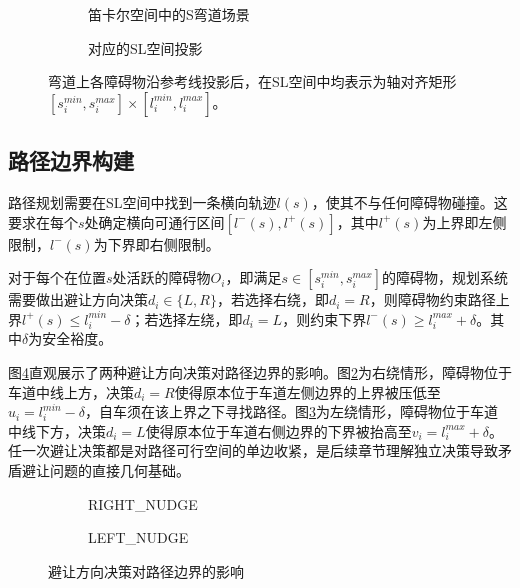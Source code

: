\begin{figure}[htbp]
\centering
\begin{subfigure}[b]{0.48\textwidth}
  \centering
  \caption{笛卡尔空间中的S弯道场景}
\end{subfigure}
\hfill
\begin{subfigure}[b]{0.48\textwidth}
  \centering
  \caption{对应的SL空间投影}
\end{subfigure}
\caption{SL空间中障碍物投影示意图}
\caption*{\scriptsize 弯道上各障碍物沿参考线投影后，在SL空间中均表示为轴对齐矩形$[s_i^{min},s_i^{max}] \times [l_i^{min},l_i^{max}]$。}
\label{fig:sl_projection}
\end{figure}

\subsection{路径边界构建}

路径规划需要在SL空间中找到一条横向轨迹$l(s)$，使其不与任何障碍物碰撞。这要求在每个$s$处确定横向可通行区间$[l^-(s), l^+(s)]$，其中$l^+(s)$为上界即左侧限制，$l^-(s)$为下界即右侧限制。

对于每个在位置$s$处活跃的障碍物$O_i$，即满足$s \in [s_i^{min}, s_i^{max}]$的障碍物，规划系统需要做出避让方向决策$d_i \in \{L, R\}$，若选择右绕，即$d_i = R$，则障碍物约束路径上界$l^+(s) \leq l_i^{min} - \delta$；若选择左绕，即$d_i = L$，则约束下界$l^-(s) \geq l_i^{max} + \delta$。其中$\delta$为安全裕度。

图\ref{fig:nudge_decision}直观展示了两种避让方向决策对路径边界的影响。图\ref{fig:nudge_decision:a}为右绕情形，障碍物位于车道中线上方，决策$d_i=R$使得原本位于车道左侧边界的上界被压低至$u_i=l_i^{min}-\delta$，自车须在该上界之下寻找路径。图\ref{fig:nudge_decision:b}为左绕情形，障碍物位于车道中线下方，决策$d_i=L$使得原本位于车道右侧边界的下界被抬高至$v_i=l_i^{max}+\delta$。任一次避让决策都是对路径可行空间的单边收紧，是后续章节理解独立决策导致矛盾避让问题的直接几何基础。

\begin{figure}[htbp]
\centering
\begin{subfigure}[b]{0.48\textwidth}
  \centering
  \caption{RIGHT\_NUDGE}
  \label{fig:nudge_decision:a}
\end{subfigure}\hfill
\begin{subfigure}[b]{0.48\textwidth}
  \centering
  \caption{LEFT\_NUDGE}
  \label{fig:nudge_decision:b}
\end{subfigure}
\caption{避让方向决策对路径边界的影响}
\label{fig:nudge_decision}
\end{figure}

